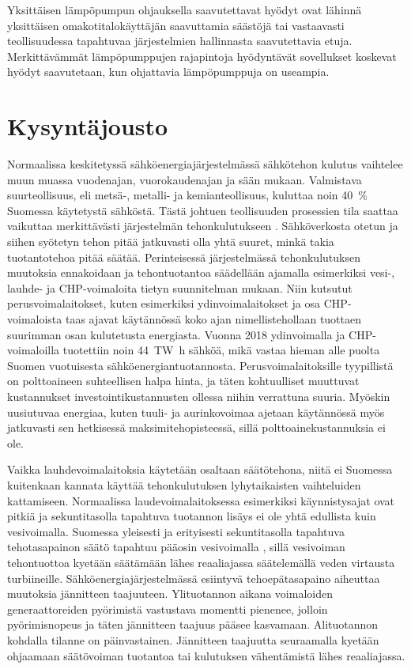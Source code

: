   Yksittäisen lämpöpumpun ohjauksella saavutettavat hyödyt ovat lähinnä yksittäisen omakotitalokäyttäjän saavuttamia säästöjä tai vastaavasti teollisuudessa tapahtuvaa järjestelmien hallinnasta saavutettavia etuja. Merkittävämmät lämpöpumppujen rajapintoja hyödyntävät sovellukset koskevat hyödyt saavutetaan, kun ohjattavia lämpöpumppuja on useampia.

\section{Kysyntäjousto}

  Normaalissa keskitetyssä sähköenergiajärjestelmässä sähkötehon kulutus vaihtelee muun muassa vuodenajan, vuorokaudenajan ja sään mukaan. Valmistava suurteollisuus, eli metsä-, metalli- ja kemianteollisuus, kuluttaa noin \SI{40}{\percent} Suomessa käytetystä sähköstä. Tästä johtuen teollisuuden prosessien tila saattaa vaikuttaa merkittävästi järjestelmän tehonkulutukseen \parencite{SVTehk}. Sähköverkosta otetun ja siihen syötetyn tehon pitää jatkuvasti olla yhtä suuret, minkä takia tuotantotehoa pitää säätää. Perinteisessä järjestelmässä tehonkulutuksen muutoksia ennakoidaan ja tehontuotantoa säädellään ajamalla esimerkiksi vesi-, lauhde- ja \gls{CHP}-voimaloita tietyn suunnitelman mukaan. \parencite{energiateollisuus} Niin kutsutut perusvoimalaitokset, kuten esimerkiksi ydinvoimalaitokset ja osa \gls{CHP}-voimaloista taas ajavat käytännössä koko ajan nimellistehollaan tuottaen suurimman osan kulutetusta energiasta. Vuonna 2018 ydinvoimalla ja \gls{CHP}-voimaloilla tuotettiin noin \SI{44}{\tera\watt\hour} sähköä, mikä vastaa hieman alle puolta Suomen vuotuisesta sähköenergiantuotannosta. \parencite{SVTSaLaTuo} Perusvoimalaitoksille tyypillistä on polttoaineen suhteellisen halpa hinta, ja täten kohtuulliset muuttuvat kustannukset investointikustannusten ollessa niihin verrattuna suuria. Myöskin uusiutuvaa energiaa, kuten tuuli- ja aurinkovoimaa ajetaan käytännössä myös jatkuvasti sen hetkisessä maksimitehopisteessä, sillä polttoainekustannuksia ei ole.

  Vaikka lauhdevoimalaitoksia käytetään osaltaan säätötehona, niitä ei Suomessa kuitenkaan kannata käyttää tehonkulutuksen lyhytaikaisten vaihteluiden kattamiseen. Normaalissa laudevoimalaitoksessa esimerkiksi käynnistysajat ovat pitkiä ja sekuntitasolla tapahtuva tuotannon lisäys ei ole yhtä edullista kuin vesivoimalla. \parencite{VJV2018} Suomessa yleisesti ja erityisesti sekuntitasolla tapahtuva tehotasapainon säätö tapahtuu pääosin vesivoimalla \parencite{energiateollisuus}, sillä vesivoiman tehontuottoa kyetään säätämään lähes reaaliajassa säätelemällä veden virtausta turbiineille. Sähköenergiajärjestelmässä esiintyvä tehoepätasapaino aiheuttaa muutoksia jännitteen taajuuteen. Ylituotannon aikana voimaloiden generaattoreiden pyörimistä vastustava momentti pienenee, jolloin pyörimisnopeus ja täten jännitteen taajuus pääsee kasvamaan. Alituotannon kohdalla tilanne on päinvastainen. Jännitteen taajuutta seuraamalla kyetään ohjaamaan säätövoiman tuotantoa tai kulutuksen vähentämistä lähes reaaliajassa. \parencite{fingrid}

